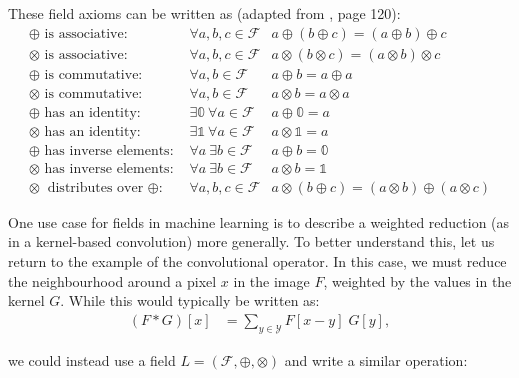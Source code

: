 \documentclass[a4paper, 12pt]{report}
\begin{document}
These field axioms can be written as (adapted from \cite{beachy2006abstract}, page 120):
\begin{align}
\textrm{$\oplus$ is associative: }&\forall a,b,c\in \mathcal{F} &  a \oplus (b \oplus c) = (a\oplus b) \oplus c \\ 
\textrm{$\otimes$ is associative: }&\forall a,b,c\in \mathcal{F} &  a \otimes (b \otimes c) = (a\otimes b) \otimes c \\ 
\textrm{$\oplus$ is commutative: }&\forall a,b\in \mathcal{F} & a\oplus b = a  \oplus a \\
\textrm{$\otimes$ is commutative: }&\forall a,b\in \mathcal{F} & a\otimes b = a  \otimes a \\
\oplus\textrm{ has an identity: }& \exists \mathbb{0} ~\forall a\in \mathcal{F} & a\oplus \mathbb{0} = a \\ 
\otimes\textrm{ has an identity: }& \exists \mathbb{1} ~\forall a\in \mathcal{F} & a\otimes \mathbb{1} = a \\ 
\oplus\textrm{ has inverse elements: }& \forall a~\exists b\in \mathcal{F} & a\oplus b = \mathbb{0} \label{eq:additive-inverse}  \\ 
\otimes\textrm{ has inverse elements: }& \forall a~\exists b\in \mathcal{F} & a\otimes b = \mathbb{1}  \\ 
\otimes \textrm{ distributes over $\oplus$: }&\forall a,b,c\in \mathcal{F} & a\otimes (b \oplus c) = (a\otimes b)\oplus(a\otimes c)
\end{align}

One use case for fields in machine learning is to describe a weighted reduction (as in a kernel-based convolution) more generally. To better understand this, let us return to the example of the convolutional operator. In this case, we must reduce the neighbourhood around a pixel $x$ in the image $F$, weighted by the values in the kernel $G$. While this would typically be written as:
\begin{align}
	(F*G)[x] &= \sum_{y\in\mathcal{Y}} F[x-y]\; G[y],
\end{align}

\noindent
we could instead use a field $L=(\mathcal{F}, \oplus, \otimes)$ and write a similar operation:
\end{document}
